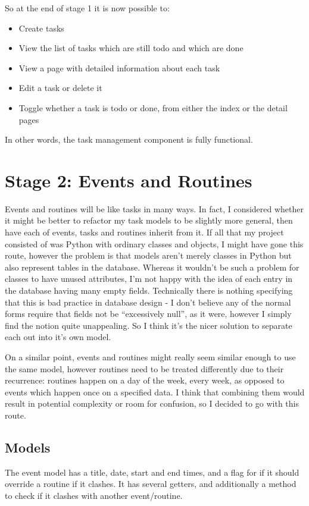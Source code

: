 \documentclass{article}
\begin{document}
So at the end of stage 1 it is now possible to:
\begin{samepage}
	\begin{itemize}
		\item Create tasks
		\item View the list of tasks which are still todo and which are done
		\item View a page with detailed information about each task
		\item Edit a task or delete it
		\item Toggle whether a task is todo or done,
		      from either the index or the detail pages
	\end{itemize}
\end{samepage}

In other words,
the task management component is fully functional.

\section{Stage 2: Events and Routines}
Events and routines will be like tasks in many ways.
In fact,
I considered whether it might be better to refactor my task models to be slightly more general,
then have each of events, tasks and routines inherit from it.
If all that my project consisted of was Python with ordinary classes and objects,
I might have gone this route,
however the problem is that models aren't merely classes in Python but also represent tables in the database.
Whereas it wouldn't be such a problem for classes to have unused attributes,
I'm not happy with the idea of each entry in the database having many empty fields.
Technically there is nothing specifying that this is bad practice in database design -
I don't believe any of the normal forms require that fields not be ``excessively null'',
as it were,
however I simply find the notion quite unappealing.
So I think it's the nicer solution to separate each out into it's own model.

On a similar point,
events and routines might really seem similar enough to use the same model,
however routines need to be treated differently due to their recurrence:
routines happen on a day of the week,
every week,
as opposed to events which happen once on a specified data.
I think that combining them would result in potential complexity or room for confusion,
so I decided to go with this route.

\subsection{Models}
The event model has a title, date, start and end times,
and a flag for if it should override a routine if it clashes.
It has several getters,
and additionally a method to check if it clashes with another event/routine.
\end{document}
